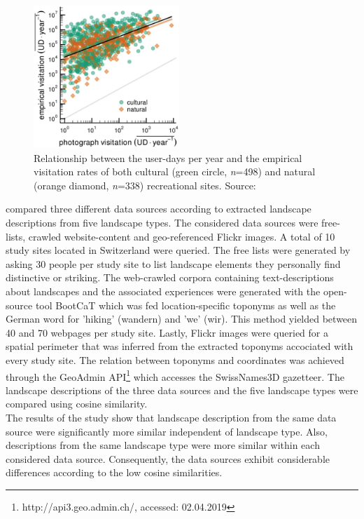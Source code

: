 \begin{figure}[h]
   \begin{center}
   \includegraphics[width=0.49\textwidth]{img/wood_user_photodays.pdf}
   \end{center}
   \caption{Relationship between the user-days per year and the empirical visitation rates of both cultural (green circle, \textit{n}=498) and natural (orange diamond, \textit{n}=338) recreational sites. Source: \textcite[p.4]{Wood2013}}
   \label{fig:wood_user_days}
\end{figure}

\textcite{Wartmann2018} compared three different data sources according to extracted landscape descriptions from five landscape types. The considered data sources were free-lists, crawled website-content and geo-referenced Flickr images. A total of 10 study sites located in Switzerland were queried. The free lists were generated by asking 30 people per study site to list landscape elements they personally find distinctive or striking. The web-crawled corpora containing text-descriptions about landscapes and the associated experiences were generated with the open-source tool BootCaT \parencite{Baroni2004} which was fed location-specific toponyms as well as the German word for 'hiking' (wandern) and 'we' (wir). This method yielded between 40 and 70 webpages per study site. Lastly, Flickr images were queried for a spatial perimeter that was inferred from the extracted toponyms accociated with every study site. The relation between toponyms and coordinates was achieved through the GeoAdmin API\footnote{http://api3.geo.admin.ch/, accessed: 02.04.2019} which accesses the SwissNames3D gazetteer. The landscape descriptions of the three data sources and the five landscape types were compared using cosine similarity. \\ 
The results of the study show that landscape description from the same data source were significantly more similar independent of landscape type. Also, descriptions from the same landscape type were more similar within each considered data source. Consequently, the data sources exhibit considerable differences according to the low cosine similarities.


